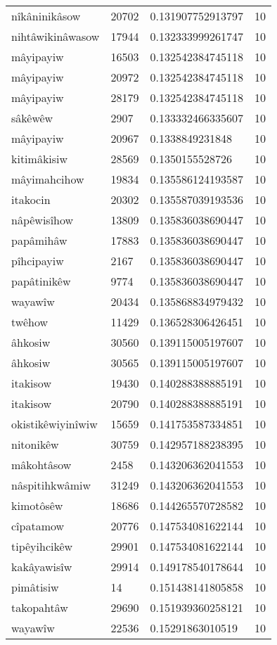 \begin{longtable}{llll}
nîkâninikâsow & 20702 & 0.131907752913797 & 10 \\
nihtâwikinâwasow & 17944 & 0.132333999261747 & 10 \\
mâyipayiw & 16503 & 0.132542384745118 & 10 \\
mâyipayiw & 20972 & 0.132542384745118 & 10 \\
mâyipayiw & 28179 & 0.132542384745118 & 10 \\
sâkêwêw & 2907 & 0.133332466335607 & 10 \\
mâyipayiw & 20967 & 0.1338849231848 & 10 \\
kitimâkisiw & 28569 & 0.1350155528726 & 10 \\
mâyimahcihow & 19834 & 0.135586124193587 & 10 \\
itakocin & 20302 & 0.135587039193536 & 10 \\
nâpêwisîhow & 13809 & 0.135836038690447 & 10 \\
papâmihâw & 17883 & 0.135836038690447 & 10 \\
pîhcipayiw & 2167 & 0.135836038690447 & 10 \\
papâtinikêw & 9774 & 0.135836038690447 & 10 \\
wayawîw & 20434 & 0.135868834979432 & 10 \\
twêhow & 11429 & 0.136528306426451 & 10 \\
âhkosiw & 30560 & 0.139115005197607 & 10 \\
âhkosiw & 30565 & 0.139115005197607 & 10 \\
itakisow & 19430 & 0.140288388885191 & 10 \\
itakisow & 20790 & 0.140288388885191 & 10 \\
okistikêwiyinîwiw & 15659 & 0.141753587334851 & 10 \\
nitonikêw & 30759 & 0.142957188238395 & 10 \\
mâkohtâsow & 2458 & 0.143206362041553 & 10 \\
nâspitihkwâmiw & 31249 & 0.143206362041553 & 10 \\
kimotôsêw & 18686 & 0.144265570728582 & 10 \\
cîpatamow & 20776 & 0.147534081622144 & 10 \\
tipêyihcikêw & 29901 & 0.147534081622144 & 10 \\
kakâyawisîw & 29914 & 0.149178540178644 & 10 \\
pimâtisiw & 14 & 0.151438141805858 & 10 \\
takopahtâw & 29690 & 0.151939360258121 & 10 \\
wayawîw & 22536 & 0.15291863010519 & 10 \\

\end{longtable}
